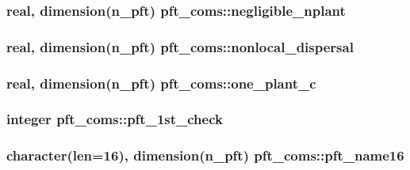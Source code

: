 \subsubsection[{negligible\+\_\+nplant}]{\setlength{\rightskip}{0pt plus 5cm}real, dimension(n\+\_\+pft) pft\+\_\+coms\+::negligible\+\_\+nplant}\label{namespacepft__coms_a35da186f9b0c1860742f4496333703a7}
\hypertarget{namespacepft__coms_ab4b143dec3e017f4e90ee99ca12bb329}{}
\subsubsection[{nonlocal\+\_\+dispersal}]{\setlength{\rightskip}{0pt plus 5cm}real, dimension(n\+\_\+pft) pft\+\_\+coms\+::nonlocal\+\_\+dispersal}\label{namespacepft__coms_ab4b143dec3e017f4e90ee99ca12bb329}
\hypertarget{namespacepft__coms_a584bfab014a9ec5b4a5d7ed9e458df9f}{}
\subsubsection[{one\+\_\+plant\+\_\+c}]{\setlength{\rightskip}{0pt plus 5cm}real, dimension(n\+\_\+pft) pft\+\_\+coms\+::one\+\_\+plant\+\_\+c}\label{namespacepft__coms_a584bfab014a9ec5b4a5d7ed9e458df9f}
\hypertarget{namespacepft__coms_a46f15da0b9bf81a4f8bdba850efff1c8}{}
\subsubsection[{pft\+\_\+1st\+\_\+check}]{\setlength{\rightskip}{0pt plus 5cm}integer pft\+\_\+coms\+::pft\+\_\+1st\+\_\+check}\label{namespacepft__coms_a46f15da0b9bf81a4f8bdba850efff1c8}
\hypertarget{namespacepft__coms_abbfea830303582f918e1630cb7009694}{}
\subsubsection[{pft\+\_\+name16}]{\setlength{\rightskip}{0pt plus 5cm}character(len=16), dimension(n\+\_\+pft) pft\+\_\+coms\+::pft\+\_\+name16}\label{namespacepft__coms_abbfea830303582f918e1630cb7009694}
\hypertarget{namespacepft__coms_a5a3bbf23e4825378c0f3c8bd788c6c68}{}
